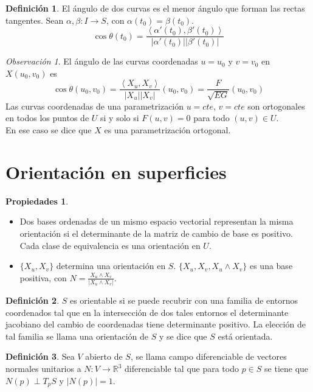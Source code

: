 \documentclass{report}
\theoremstyle{remark}
\newtheorem*{remark}{Observación}
\theoremstyle{remark}
\theoremstyle{definition}
\newtheorem{definition}{Definición}[chapter]
\theoremstyle{definition}
\newtheorem*{properties}{Propiedades}
\theoremstyle{definition}
\begin{document}
\begin{definition}
    El ángulo de dos curvas es el menor ángulo que forman las rectas tangentes.
    Sean $\alpha, \beta : I \to S$, con $\alpha(t_0) = \beta(t_0)$.
    $$\cos \theta(t_0) = \frac{\left\langle \alpha'(t_0), \beta'(t_0) \right\rangle}{|\alpha'(t_0)||\beta'(t_0)|}$$
\end{definition}

\begin{remark}
    El ángulo de las curvas coordenadas $u = u_0$ y $v = v_0$ en $X(u_0, v_0)$ es
    $$\cos \theta(u_0, v_0) = \frac{\left\langle X_u, X_v \right\rangle}{|X_u||X_v|} (u_0, v_0) = \frac{F}{\sqrt{EG}} (u_0, v_0)$$
    Las curvas coordenadas de una parametrización $u = cte$, $v = cte$ son ortogonales en todos los puntos de $U$ si y solo si $F(u, v) = 0$ para todo $(u, v) \in U$.\\
    En ese caso se dice que $X$ es una parametrización ortogonal.
\end{remark}

\section{Orientación en superficies}

\begin{properties}
    \hfill
    \begin{itemize}
        \item Dos bases ordenadas de un mismo espacio vectorial representan la misma orientación si el determinante de la matriz de cambio de base es positivo.
              Cada clase de equivalencia es una orientación en $U$.
        \item $\{X_u, X_v\}$ determina una orientación en $S$.
              $\{X_u, X_v, X_u \land X_v\}$ es una base positiva, con $N = \frac{X_u \land X_v}{|X_u \land X_v|}$.
    \end{itemize}
\end{properties}

\begin{definition}
    $S$ es orientable si se puede recubrir con una familia de entornos coordenados tal que en la intersección de dos tales entornos el determinante jacobiano del cambio de coordenadas tiene determinante positivo.
    La elección de tal familia se llama una orientación de $S$ y se dice que $S$ está orientada.
\end{definition}

\begin{definition}
    Sea $V$ abierto de $S$, se llama campo diferenciable de vectores normales unitarios a $N : V \to \mathbb{R}^3$ diferenciable tal que para todo $p \in S$ se tiene que $N(p) \perp T_pS$ y $|N(p)| = 1$.
\end{definition}
\end{document}

